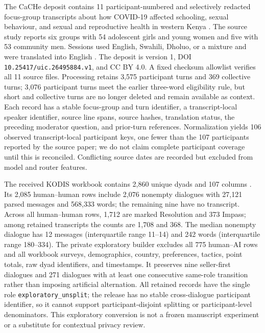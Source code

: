 The CaCHe deposit contains 11 participant-numbered and selectively redacted focus-group transcripts about how COVID-19 affected schooling, sexual behaviour, and sexual and reproductive health in western Kenya \citep{mehta2024cache2}. The source study reports six groups with 54 adolescent girls and young women and five with 53 community men. Sessions used English, Swahili, Dholuo, or a mixture and were translated into English \citep{awiti2024agyw}. The deposit is version 1, DOI \texttt{10.25417/uic.26495884.v1}, and CC BY 4.0. A fixed checksum allowlist verifies all 11 source files. Processing retains 3,575 participant turns and 369 collective turns; 3,076 participant turns meet the earlier three-word eligibility rule, but short and collective turns are no longer deleted and remain available as context. Each record has a stable focus-group and turn identifier, a transcript-local speaker identifier, source line spans, source hashes, translation status, the preceding moderator question, and prior-turn references. Normalization yields 106 observed transcript-local participant keys, one fewer than the 107 participants reported by the source paper; we do not claim complete participant coverage until this is reconciled. Conflicting source dates are recorded but excluded from model and router features.

The received KODIS workbook contains 2,860 unique dyads and 107 columns
\citep{hale2025kodis}. Its 2,085 human--human rows include 2,076 nonempty
dialogues with 27,121 parsed messages and 568,333 words; the remaining nine
have no transcript. Across all human--human rows, 1,712 are marked Resolution
and 373 Impass; among retained transcripts the counts are 1,708 and 368. The
median nonempty dialogue has 12 messages (interquartile
range 11--14) and 242 words (interquartile range 180--334). The private
exploratory builder excludes all 775 human--AI rows and all workbook surveys,
demographics, country, preferences, tactics, point totals, raw dyad identifiers,
and timestamps. It preserves nine seller-first dialogues and 271 dialogues with
at least one consecutive same-role transition rather than imposing artificial
alternation. All retained records have the single role
\texttt{exploratory\_unsplit}; the release has no stable cross-dialogue
participant identifier, so it cannot support participant-disjoint splitting or
participant-level denominators. This exploratory conversion is not a frozen
manuscript experiment or a substitute for contextual privacy review.

